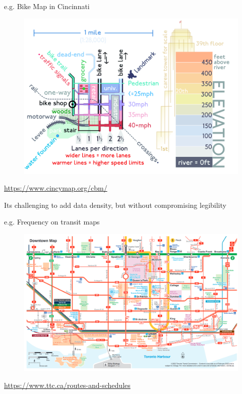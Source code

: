 \documentclass[aspectratio=169]{beamer}
\begin{document}
\begin{frame}
	
	e.g. Bike Map in Cincinnati
	
	\begin{figure}
		\centering
		\includegraphics[width=0.8\linewidth]{images/bike_map_leg.png}
	\end{figure}
	
	\tiny \url{https://www.cincymap.org/cbm/}
	
\end{frame}




\begin{frame}
	
	Its challenging to add data density, but without compromising legibility
	
	\vspace{2mm}
		e.g. Frequency on transit maps
	\begin{figure}
		\centering
		\includegraphics[width=0.84\linewidth]{images/ttc_downtown.png}
	\end{figure}
	
	\tiny \url{https://www.ttc.ca/routes-and-schedules}
	
\end{frame}
\end{document}
